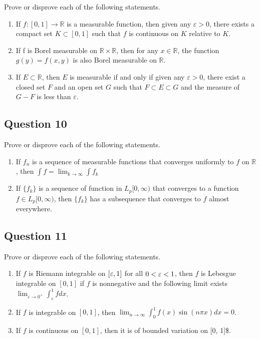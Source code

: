 \documentclass[12pt]{article}
\begin{document}
Prove or disprove each of the following statements.

\begin{enumerate}
\def\labelenumi{(\alph{enumi})}
\item
  If \(f : [0, 1] \to \mathbb{R}\) is a measurable function, then given
  any \(\varepsilon > 0\), there exists a compact set
  \(K \subset [0, 1]\) such that \(f\) is continuous on \(K\) relative
  to \(K\).
\item
  If f is Borel measurable on \(\mathbb{R} \times \mathbb{R}\), then for
  any \(x \in \mathbb{R}\), the function \(g(y) = f(x, y)\) is also
  Borel measurable on \(\mathbb{R}\).
\item
  If \(E \subset \mathbb{R}\), then \(E\) is measurable if and only if
  given any \(\varepsilon > 0\), there exist a closed set \(F\) and an
  open set \(G\) such that \(F \subset E \subset G\) and the measure of
  \(G-F\) is less than \(\varepsilon\).
\end{enumerate}

\hypertarget{question-10-1}{%
\subsection{Question 10}\label{question-10-1}}

Prove or disprove each of the following statements.

\begin{enumerate}
\def\labelenumi{(\alph{enumi})}
\setcounter{enumi}{1}
\item
  If \({f_n}\) is a sequence of measurable functions that converges
  uniformly to \(f\) on \(\mathbb{R}\), then
  \(\int{f}=\lim_{k\to \infty} \int f_k\)
\item
  If \(\{f_k\}\) is a sequence of function in \(L_p[0,\infty)\) that
  converges to a function \(f \in L_p [0,\infty)\), then \(\{f_k\}\) has
  a subsequence that converges to \(f\) almost everywhere.
\end{enumerate}

\hypertarget{question-11-1}{%
\subsection{Question 11}\label{question-11-1}}

Prove or disprove each of the following statements.

\begin{enumerate}
\def\labelenumi{(\alph{enumi})}
\setcounter{enumi}{5}
\item
  If \(f\) is Riemann integrable on \([\varepsilon, 1]\) for all
  \(0 < \varepsilon < 1\), then \(f\) is Lebesgue integrable on \([0,1]\) if
  \(f\) is nonnegative and the following limit exists
  \(\lim_{\varepsilon\to 0^+} \int_\varepsilon^1 f dx\).
\item
  If \(f\) is integrable on \([0,1]\), then
  \(\lim_{n\to\infty} \int_0^1 f(x)\sin(n\pi x)dx = 0\).
\item
  If \(f\) is continuous on \([0, 1]\), then it is of bounded variation
  on {[}0, 1{]}\$.
\end{enumerate}
\end{document}
